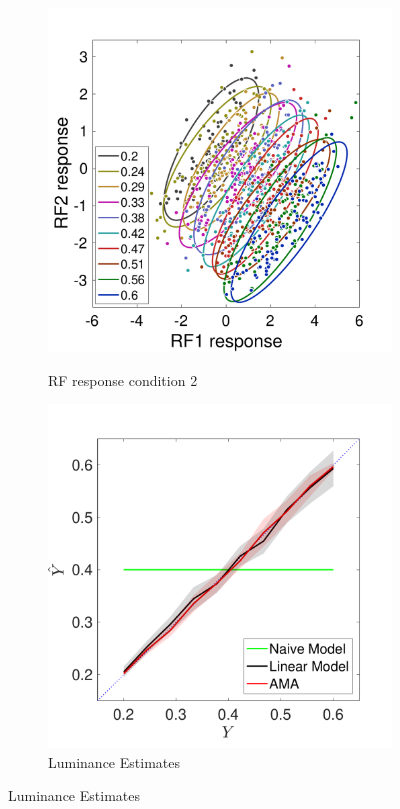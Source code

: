 \documentclass{jov}
\begin{document}
\begin{figure}
\centering
    \begin{subfigure}[b]{0.3	 \textwidth}   
        \caption{RF response condition 2}
        \includegraphics[width=\textwidth]{../Figures/Figure10/Figure10_a.pdf}
        \label{fig:case2RFResponse}
    \end{subfigure}
        \begin{subfigure}[b]{0.3 \textwidth}
        \caption{Luminance Estimates}
        \includegraphics[width=\textwidth]{../Figures/Figure10/Figure10_b.pdf}

\end{subfigure}
\end{figure}
\end{document}
